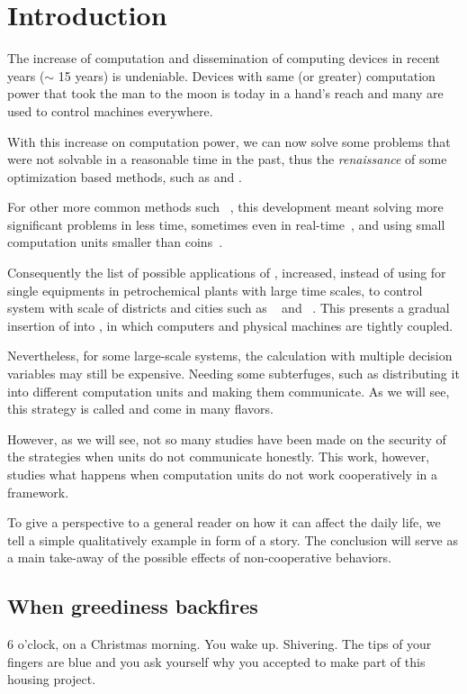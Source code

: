 \documentclass[../main.tex]{subfiles}
\begin{document}
\chapter{Introduction}\label{sec:introduction}
The increase of computation and dissemination of computing devices in recent years ($\sim$ 15 years) is undeniable.
Devices with same (or greater) computation power that took the man to the moon is today in a hand's reach and many are used to control machines everywhere.

With this increase on computation power, we can now solve some problems that were not solvable in a reasonable time in the past, thus the \emph{renaissance} of some optimization based methods, such as  and .

For other more common methods such \mpc~\cite{GarciaEtAl1989}, this development meant solving more significant problems in less time, sometimes even in real-time~\cite{BesselmannEtAl2008}, and using small computation units smaller than coins~\cite{BanguraMahony2014}.

Consequently the list of possible applications of \mpc{}, increased, instead of using for single equipments in petrochemical plants with large time scales, to control system with scale of districts and cities such as \wdns~\cite{ZhangEtAl2021} and \dhns~\cite{TaylorEtAl2021}.
This presents a gradual insertion of \mpc{} into \cps{}, in which computers and physical machines are tightly coupled.

Nevertheless, for some large-scale systems, the calculation with multiple decision variables may still be expensive.
Needing some subterfuges, such as distributing it into different computation units and making them communicate.
As we will see, this strategy is called \dmpc and come in many flavors.

However, as we will see, not so many studies have been made on the security of the \dmpc{} strategies when units do not communicate honestly.
This work, however, studies what happens when computation units do not work cooperatively in a \dmpc{} framework.

To give a perspective to a general reader on how it can affect the daily life, we tell a simple qualitatively example in form of a story. The conclusion will serve as a main take-away of the possible effects of non-cooperative behaviors.

\section{When greediness backfires}
6 o'clock, on a Christmas morning.
You wake up.
Shivering.
The tips of your fingers are blue and you ask yourself why you accepted to make part of this housing project.
\end{document}
